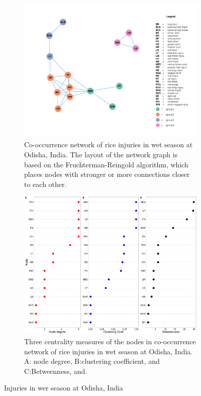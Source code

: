 \begin{figure}
    \centering
    \begin{subfigure}[b]{1\textwidth}
        \includegraphics[width = 1\textwidth]{figures/networkOR_ws.pdf}
        \caption{Co-occurrence network of rice injuries in wet season at Odisha, India. The layout of the network graph is based on the Fruchterman-Reingold algorithm, which places nodes with stronger or more connections closer to each other.}
        \label{fig:gull}
    \end{subfigure}
    \begin{subfigure}[b]{1\textwidth}
        \includegraphics[width = 1\textwidth]{figures/nodepropOR_ws.pdf}
        \caption{Three centrality measures of the nodes in co-occurrence network of rice injuries in wet season at Odisha, India. A: node degree, B:clustering coefficient, and C:Betweenness, and.}
        \label{fig:nodepropCP_ds}
    \end{subfigure}
    \caption{Injuries in wer season at Odisha, India}
    \label{fig:OD_ws}
\end{figure}


